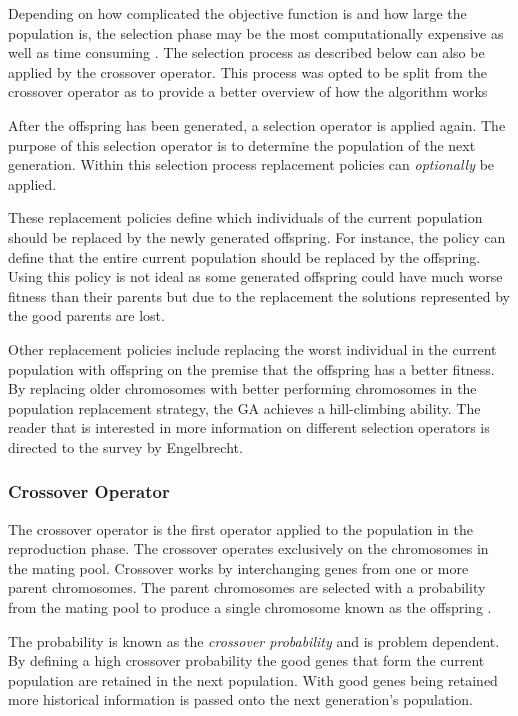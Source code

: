 Depending on how complicated the objective function is and how large the population is, the selection phase may be the most computationally expensive as well as time consuming \cite{AcceleratingGA}. The selection process as described below  can also be applied by the crossover operator. This process was opted to be split from the crossover operator as to provide a better overview of how the algorithm works

After the offspring has been generated, a selection operator is applied again\cite{CompuIntelligenceIntro}. The purpose of this selection operator is to determine the population of the next generation\cite{CompuIntelligenceIntro}. Within this selection process replacement policies can \emph{optionally} be applied\cite{CompuIntelligenceIntro}. 

These replacement policies define which individuals of the current population should be replaced by the newly generated offspring\cite{CompuIntelligenceIntro}. For instance, the policy can define that the entire current population should be replaced by the offspring\cite{CompuIntelligenceIntro}. Using this policy is not ideal as some generated offspring could have much worse fitness than their parents but due to the replacement the solutions represented by the good parents are lost\cite{CompuIntelligenceIntro}. 

Other replacement policies include replacing the worst individual in the current population with offspring on the premise that the offspring has a better fitness\cite{CompuIntelligenceIntro}. By replacing older chromosomes with better performing chromosomes in the population replacement strategy, the \gls{GA} achieves a hill-climbing ability. The reader that is interested in more information on different selection operators is directed to the survey by Engelbrecht\cite{CompuIntelligenceIntro}.
\subsubsection{Crossover Operator}
\label{sec:crossover}
The crossover operator is the first operator applied to the population in the reproduction phase. The crossover operates exclusively on the chromosomes in the mating pool. Crossover works by interchanging genes from one or more parent chromosomes. The parent chromosomes are selected with a probability from the mating pool to produce a single chromosome known as the offspring \cite{FamilyGA,HumanPassiveGA,CoactiveFuzzyGA}. 

The probability is known as the \emph{crossover probability} and is problem dependent\cite{CompuIntelligenceIntro}. By defining a high crossover probability the good genes that form the current population are retained in the next population\cite{CompuIntelligenceIntro}. With good genes being retained more historical information is passed onto the next generation's population\cite{FamilyGA}.

